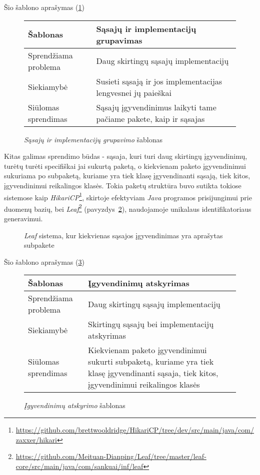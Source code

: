 Šio šablono aprašymas (\ref{table:implGr})
\begin{figure}[H]
\begin{center}
\begin{tabular}{|p{5cm}|p{10cm}|}
    \hline
    Šablonas & Sąsajų ir implementacijų grupavimas \\ [0.5ex]
    \hline\hline
    Sprendžiama problema & Daug skirtingų sąsajų implementacijų\\
    \hline
    Siekiamybė & Susieti sąsają ir jos implementacijas lengvesnei jų paieškai\\
    \hline
    Siūlomas sprendimas & Sąsajų įgyvendinimus laikyti tame pačiame pakete, kaip ir sąsajas \\
    \hline
\end{tabular}
\end{center}
\caption{\textit{Sąsajų ir implementacijų grupavimo} šablonas}
\label{table:implGr}
\end{figure}
Kitas galimas sprendimo būdas - sąsaja, kuri turi daug skirtingų įgyvendinimų, turėtų turėti specifiškai jai sukurtą paketą, o kiekvienam paketo
įgyvendinimui sukuriama po subpaketą, kuriame yra tiek klasę įgyvendinanti sąsają, tiek kitos, įgyvendinimui reikalingos klasės.
Tokia paketų struktūra buvo sutikta tokiose sistemose kaip \textit{HikariCP}\footnote{\url{https://github.com/brettwooldridge/HikariCP/tree/dev/src/main/java/com/zaxxer/hikari}},
skirtoje efektyviam \textit{Java} programos prisijungimui prie duomenų bazių, bei
\textit{Leaf}\footnote{\url{https://github.com/Meituan-Dianping/Leaf/tree/master/leaf-core/src/main/java/com/sankuai/inf/leaf}} (pavyzdys~\ref{fig:leaf}), naudojamoje unikalaus identifikatoriaus generavimui.

\begin{figure}[H]
    \snugshade
    \endsnugshade
    \caption{\textit{Leaf} sistema, kur kiekvienas sąsajos įgyvendinimas yra aprašytas subpakete}
    \label{fig:leaf}
\end{figure}
Šio šablono aprašymas (\ref{table:implSub})
\begin{figure}[H]
\begin{center}
    \begin{tabular}{|p{5cm}|p{10cm}|}
        \hline
        Šablonas & Įgyvendinimų atskyrimas \\ [0.5ex]
        \hline\hline
        Sprendžiama problema & Daug skirtingų sąsajų implementacijų\\
        \hline
        Siekiamybė & Skirtingų sąsajų bei implementacijų atskyrimas\\
        \hline
        Siūlomas sprendimas & Kiekvienam paketo įgyvendinimui sukurti subpaketą, kuriame yra tiek klasę įgyvendinanti sąsaja, tiek kitos, įgyvendinimui reikalingos klasės \\
        \hline
    \end{tabular}
\end{center}
\caption{\textit{Įgyvendinimų atskyrimo} šablonas}
\label{table:implSub}
\end{figure}
